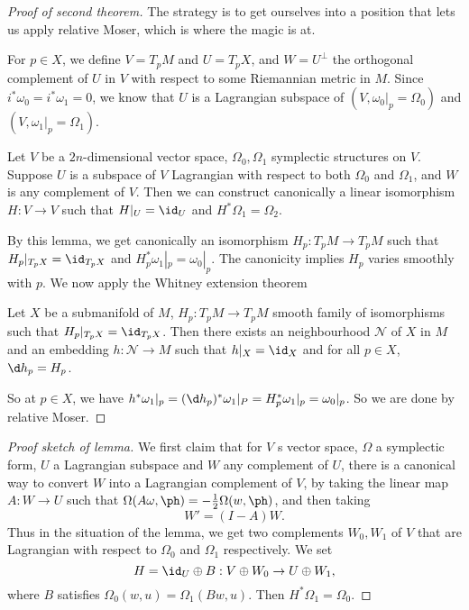 \documentclass[a4paper]{article}
\begin{document}
\begin{proof}[Proof of second theorem]
  The strategy is to get ourselves into a position that lets us apply relative Moser, which is where the magic is at.

  For $p \in X$, we define $V = T_p M$ and $U = T_p X$, and $W = U^\perp$ the orthogonal complement of $U$ in $V$ with respect to some Riemannian metric in $M$. Since $i^* \omega_0 = i^* \omega_1 = 0$, we know that $U$ is a Lagrangian subspace of $(V, \omega_0|_p = \Omega_0)$ and $(V, \omega_1|_p = \Omega_1)$.

  \begin{lemma}
    Let $V$ be a $2n$-dimensional vector space, $\Omega_0, \Omega_1$ symplectic structures on $V$. Suppose $U$ is a subspace of $V$ Lagrangian with respect to both $\Omega_0$ and $\Omega_1$, and $W$ is any complement of $V$. Then we can construct canonically a linear isomorphism $H: V \to V$ such that $H|_U = \id_U$ and $H^* \Omega_1 = \Omega_2$.
  \end{lemma}
  By this lemma, we get canonically an isomorphism $H_p: T_p M \to T_p M$ such that $H_p|_{T_p X} = \id_{T_p X}$ and $H_p^* \omega_1|_p = \omega_0|_p$. The canonicity implies $H_p$ varies smoothly with $p$. We now apply the Whitney extension theorem
  \begin{thm}
    Let $X$ be a submanifold of $M$, $H_p: T_p M \to T_p M$ smooth family of isomorphisms such that $H_p|_{T_p X} = \id_{T_p X}$. Then there exists an neighbourhood $\mathcal{N}$ of $X$ in $M$ and an embedding $h: \mathcal{N} \to M$ such that $h|_X = \id_X$ and for all $p \in X$, $\d h_p = H_p$.
  \end{thm}
  So at $p \in X$, we have $h^* \omega_1|_p = (\d h_p)^*\omega_1|_P = H_p^* \omega_1|_p = \omega_0|_p$. So we are done by relative Moser.
\end{proof}

\begin{proof}[Proof sketch of lemma]
  We first claim that for $V$ s vector space, $\Omega$ a symplectic form, $U$ a Lagrangian subspace and $W$ any complement of $U$, there is a canonical way to convert $W$ into a Lagrangian complement of $V$, by taking the linear map $A: W \to U$ such that $\Omega(A\omega, \ph) = - \frac{1}{2} \Omega(w, \ph)$, and then taking
  \[
    W' = (I - A) W.
  \]
  Thus in the situation of the lemma, we get two complements $W_0, W_1$ of $V$ that are Lagrangian with respect to $\Omega_0$ and $\Omega_1$ respectively. We set
  \[
    H = \id_U \oplus B: V \oplus W_0 \to U \oplus W_1,
  \]
  where $B$ satisfies $\Omega_0(w, u) = \Omega_1(Bw, u)$. Then $H^* \Omega_1 = \Omega_0$.
\end{proof}
\end{document}
